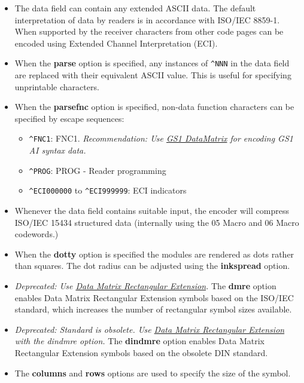 \begin{itemize}
\tightlist
\item
  The data field can contain any extended ASCII data. The default
  interpretation of data by readers is in accordance with ISO/IEC
  8859-1. When supported by the receiver characters from other code
  pages can be encoded using Extended Channel Interpretation (ECI).
\item
  When the \textbf{parse} option is specified, any instances of
  \texttt{\^{}NNN} in the data field are replaced with their equivalent
  ASCII value. This is useful for specifying unprintable characters.
\item
  When the \textbf{parsefnc} option is specified, non-data function
  characters can be specified by escape sequences:

  \begin{itemize}
  \tightlist
  \item
    \texttt{\^{}FNC1}: FNC1. \emph{Recommendation: Use
    \protect\hyperlink{gs1-datamatrix}{GS1 DataMatrix} for encoding GS1
    AI syntax data.}
  \item
    \texttt{\^{}PROG}: PROG - Reader programming
  \item
    \texttt{\^{}ECI000000} to \texttt{\^{}ECI999999}: ECI indicators
  \end{itemize}
\item
  Whenever the data field contains suitable input, the encoder will
  compress ISO/IEC 15434 structured data (internally using the 05 Macro
  and 06 Macro codewords.)
\item
  When the \textbf{dotty} option is specified the modules are rendered
  as dots rather than squares. The dot radius can be adjusted using the
  \textbf{inkspread} option.
\item
  \emph{Deprecated: Use
  \protect\hyperlink{data-matrix-rectangular-extension}{Data Matrix
  Rectangular Extension}.} The \textbf{dmre} option enables Data Matrix
  Rectangular Extension symbols based on the ISO/IEC standard, which
  increases the number of rectangular symbol sizes available.
\item
  \emph{Deprecated: Standard is obsolete. Use
  \protect\hyperlink{data-matrix-rectangular-extension}{Data Matrix
  Rectangular Extension} with the dindmre option.} The \textbf{dindmre}
  option enables Data Matrix Rectangular Extension symbols based on the
  obsolete DIN standard.
\item
  The \textbf{columns} and \textbf{rows} options are used to specify the
  size of the symbol.

\end{itemize}

